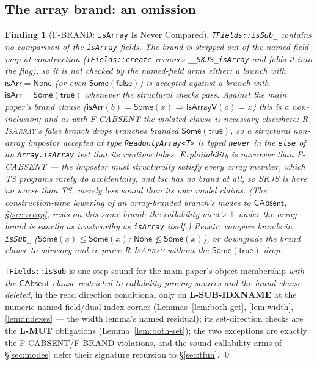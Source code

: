 \documentclass[11pt]{article}
\newtheorem{finding}[theorem]{Finding}
\begin{document}
\subsection{The array brand: an omission}

\begin{finding}[F-BRAND: \texttt{isArray} Is Never Compared]
\label{find:brand}
\texttt{TFields::isSub\_} contains no comparison of the
\texttt{isArray} fields. The brand is stripped out of the named-field
map at construction (\texttt{TFields::create} removes
\texttt{\_\_SKJS\_isArray} and folds it into the flag), so it is not
checked by the named-field arms either: a branch with
$\mathsf{isArr} = \mathsf{None}$ (or even $\mathsf{Some}(\mathsf{false})$)
is accepted against a branch with $\mathsf{isArr} =
\mathsf{Some}(\mathsf{true})$ whenever the structural checks pass.
Against the main paper's brand clause
($\mathsf{isArr}(b) = \mathsf{Some}(x) \Rightarrow \mathsf{isArrayV}(o)
= x$) this is a non-inclusion; and as with F-CABSENT the violated clause
is necessary elsewhere: \textsc{R-IsArray}'s \emph{false} branch drops
branches branded $\mathsf{Some}(\mathsf{true})$, so a structural
non-array impostor accepted at type
\texttt{ReadonlyArray<T>} is typed \texttt{never} in the
\texttt{else} of an \texttt{Array.isArray} test that its runtime takes.
Exploitability is narrower than F-CABSENT --- the impostor must
structurally satisfy every array member, which TS programs rarely do
accidentally, and tsc has no brand at all, so SKJS is here no
\emph{worse} than TS, merely less sound than its own model claims.
(The construction-time lowering of an array-branded branch's modes to
$\mathsf{CAbsent}$, \S\ref{sec:recap}, rests on this same brand: the
callability meet's $\bot$ under the array brand is exactly as
trustworthy as \texttt{isArray} itself.)
Repair: compare brands in \texttt{isSub\_}
($\mathsf{Some}(x) \leq \mathsf{Some}(x)$;
$\mathsf{None} \not\leq \mathsf{Some}(x)$), or downgrade the brand
clause to advisory and re-prove \textsc{R-IsArray} without the
$\mathsf{Some}(\mathsf{true})$-drop.
\end{finding}

\begin{theorem}
\label{thm:tfields}
\texttt{TFields::isSub} is one-step sound for the main paper's object
membership \emph{with the $\mathsf{CAbsent}$ clause restricted to
callability-proving sources and the brand clause deleted},
in the read direction conditional only on \textbf{L-SUB-IDXNAME} at
the numeric-named-field/dual-index corner
(Lemmas~\ref{lem:both-get}, \ref{lem:width}, \ref{lem:indexes} — the
width lemma's named residual);
its set-direction checks are the \textbf{L-MUT} obligations
(Lemma~\ref{lem:both-set}); the two exceptions are exactly the
F-CABSENT/F-BRAND violations, and the sound callability arms of
\S\ref{sec:modes} defer their signature recursion to
\S\ref{sec:tfun}. \qed
\end{theorem}
\end{document}
